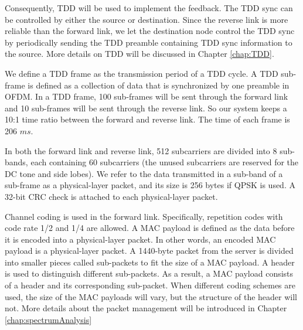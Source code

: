 Consequently, TDD will be used to implement the feedback. The TDD sync can be controlled by either the source or destination. Since the reverse link is more reliable than the forward link, we let the destination node control the TDD sync by periodically sending the TDD preamble containing TDD sync information to the source. More details on TDD will be discussed in Chapter \ref{chap:TDD}.

We define a TDD frame as the transmission period of a TDD cycle. A TDD sub-frame is defined as a collection of data that is synchronized by one preamble in OFDM. In a TDD frame, 100 sub-frames will be sent through the forward link and 10 sub-frames will be sent through the reverse link. So our system keeps a 10:1 time ratio between the forward and reverse link. The time of each frame is 206 $ms$.

In both the forward link and reverse link, 512 subcarriers are divided into 8 sub-bands, each containing 60 subcarriers (the unused subcarriers are reserved for the DC tone and side lobes). We refer to the data transmitted in a sub-band of a sub-frame as a physical-layer packet, and its size is 256 bytes if QPSK is used. A 32-bit CRC check is attached to each physical-layer packet.

Channel coding is used in the forward link. Specifically, repetition codes with code rate 1/2 and 1/4 are allowed. A MAC payload is defined as the data before it is encoded into a physical-layer packet. In other words, an encoded MAC payload is a physical-layer packet. A 1440-byte packet from the server is divided into smaller pieces called sub-packets to fit the size of a MAC payload. A header is used to distinguish different sub-packets. As a result, a MAC payload consists of a header and its corresponding sub-packet. When different coding schemes are used, the size of the MAC payloads will vary, but the structure of the header will not. More details about the packet management will be introduced in Chapter \ref{chap:spectrumAnalysis}

